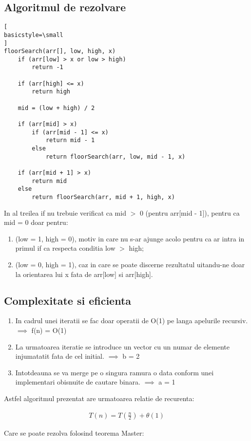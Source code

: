 \documentclass[runningheads]{llncs}
\begin{document}
\subsection{Algoritmul de rezolvare}
\begin{lstlisting}[
basicstyle=\small
]
floorSearch(arr[], low, high, x)
	if (arr[low] > x or low > high)
		return -1

	if (arr[high] <= x)
		return high
	
	mid = (low + high) / 2
	
	if (arr[mid] > x)
		if (arr[mid - 1] <= x)
			return mid - 1
		else
			return floorSearch(arr, low, mid - 1, x)
	
	if (arr[mid + 1] > x)
		return mid
	else
		return floorSearch(arr, mid + 1, high, x)
\end{lstlisting}
\vspace*{1em}
In al treilea if nu trebuie verificat ca mid $>$ 0 (pentru arr[mid - 1]), pentru ca mid = 0 doar pentru:
	\begin{enumerate}
	\item (low = 1, high = 0), motiv in care nu s-ar ajunge acolo pentru ca ar intra in primul if ca respecta
conditia low $>$ high;
	\item (low = 0, high = 1), caz in care se poate discerne rezultatul uitandu-ne doar la orientarea lui x
fata de arr[low] si arr[high].
	\end{enumerate}
\subsection{Complexitate si eficienta}
	\begin{enumerate}
	\item In cadrul unei iteratii se fac doar operatii de O(1) pe langa apelurile recursiv. $\implies$ f(n) = O(1)
	\item La urmatoarea iteratie se introduce un vector cu un numar de elemente injumatatit fata de cel initial. $\implies$ b = 2
	\item Intotdeauna se va merge pe o singura ramura o data conform unei implementari obisnuite de cautare binara. $\implies$ a = 1
\end{enumerate}
Astfel algoritmul prezentat are urmatoarea relatie de recurenta:

\begin{align*}
T(n) = T(\frac{n}{2}) + \theta(1)
\end{align*}

Care se poate rezolva folosind teorema Master:
\end{document}
